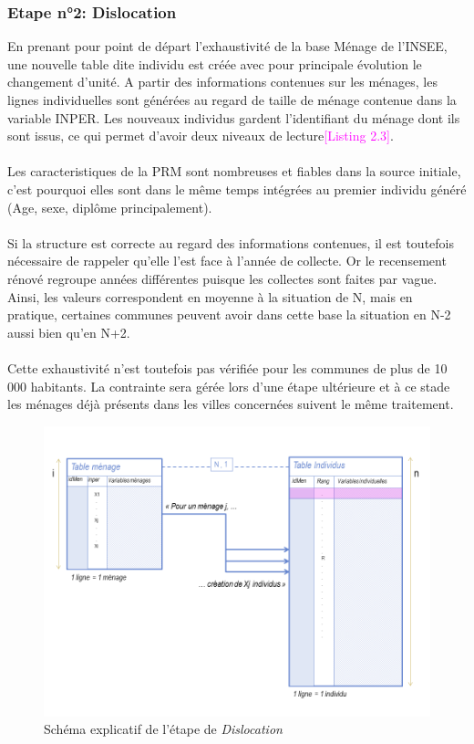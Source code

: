 \documentclass{bredele}
\begin{document}
\subsubsection{Etape n°2: \Large{Dislocation}}
En prenant pour point de départ l'exhaustivité de la base Ménage de l'INSEE, une nouvelle table dite individu est créée avec pour principale évolution le changement d'unité. A partir des informations contenues sur les ménages, les lignes individuelles sont générées au regard de taille de ménage contenue dans la variable INPER. Les nouveaux individus gardent l'identifiant du ménage dont ils sont issus, ce qui permet d'avoir deux niveaux de lecture\textcolor{magenta}{[Listing 2.3]}.\\\\
Les caracteristiques de la PRM sont nombreuses et fiables dans la source initiale, c'est pourquoi elles sont dans le même temps intégrées au premier individu généré (Age, sexe, diplôme principalement).\\\\
Si la structure est correcte au regard des informations contenues, il est toutefois nécessaire de rappeler qu'elle l'est face à l'année de collecte. Or le recensement rénové regroupe années différentes puisque les collectes sont faites par vague. Ainsi, les valeurs correspondent en moyenne à la situation de N, mais en pratique, certaines communes peuvent avoir dans cette base la situation en N-2 aussi bien qu'en N+2.\\\\
Cette exhaustivité n'est toutefois pas vérifiée pour les communes de plus de 10 000 habitants. La contrainte sera gérée lors d'une étape ultérieure et à ce stade les ménages déjà présents dans les villes concernées suivent le même traitement. \\
\begin{figure}\centering
\includegraphics[width=\textwidth]{PROCESSBDD_2.png}
\caption{Schéma explicatif de l'étape de \textit{Dislocation}}
\end{figure}
\newpage
\end{document}
